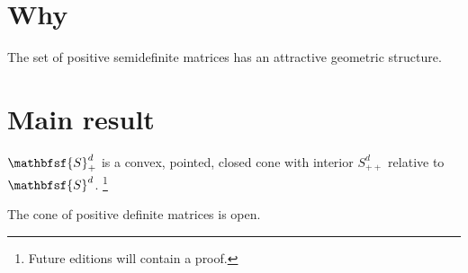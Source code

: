 
\section*{Why}

The set of positive semidefinite matrices has an attractive geometric structure.

\section*{Main result}

\begin{proposition}
$\mathbfsf{S} _+^d$ is a convex, pointed, closed cone with interior $S_{++}^d$ relative to $\mathbfsf{S} ^d$.
  \ifhmode\unskip\fi\footnote{
Future editions will contain a proof.
  }
\end{proposition}

The cone of positive definite matrices is open.

\blankpage